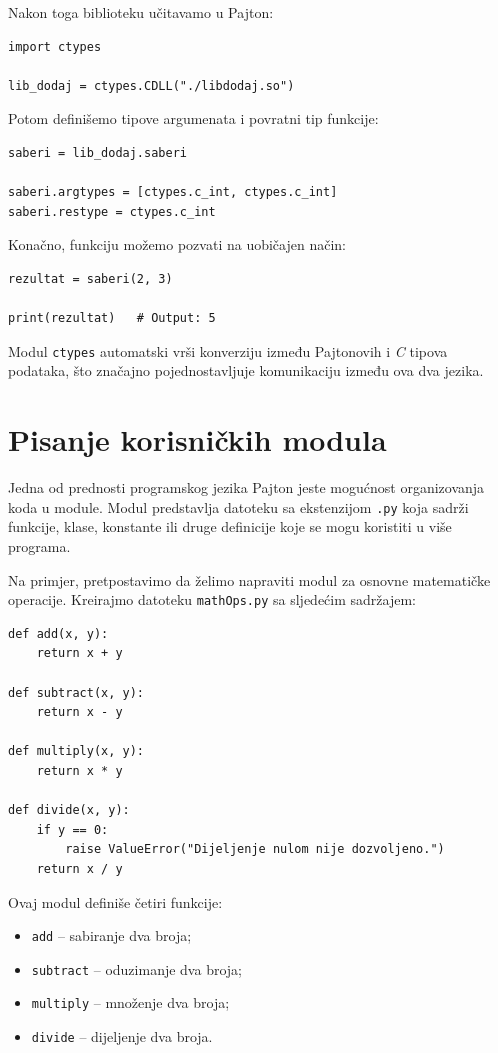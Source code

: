 Nakon toga biblioteku učitavamo u Pajton:

\begin{verbatim}
import ctypes

lib_dodaj = ctypes.CDLL("./libdodaj.so")
\end{verbatim}

Potom definišemo tipove argumenata i povratni tip funkcije:

\begin{verbatim}
saberi = lib_dodaj.saberi

saberi.argtypes = [ctypes.c_int, ctypes.c_int]
saberi.restype = ctypes.c_int
\end{verbatim}

Konačno, funkciju možemo pozvati na uobičajen način:

\begin{verbatim}
rezultat = saberi(2, 3)

print(rezultat)   # Output: 5
\end{verbatim}

Modul \texttt{ctypes} automatski vrši konverziju između Pajtonovih i \textit{C} tipova podataka, što značajno pojednostavljuje komunikaciju između ova dva jezika.

\section{Pisanje korisničkih modula}

Jedna od prednosti programskog jezika Pajton jeste mogućnost organizovanja koda u module. Modul predstavlja datoteku sa ekstenzijom \texttt{.py} koja sadrži funkcije, klase, konstante ili druge definicije koje se mogu koristiti u više programa.

Na primjer, pretpostavimo da želimo napraviti modul za osnovne matematičke operacije. Kreirajmo datoteku \texttt{mathOps.py} sa sljedećim sadržajem:

\begin{verbatim}
def add(x, y):
    return x + y

def subtract(x, y):
    return x - y

def multiply(x, y):
    return x * y

def divide(x, y):
    if y == 0:
        raise ValueError("Dijeljenje nulom nije dozvoljeno.")
    return x / y
\end{verbatim}

Ovaj modul definiše četiri funkcije:

\begin{itemize}
	\item \texttt{add} -- sabiranje dva broja;
	\item \texttt{subtract} -- oduzimanje dva broja;
	\item \texttt{multiply} -- množenje dva broja;
	\item \texttt{divide} -- dijeljenje dva broja.
\end{itemize}

